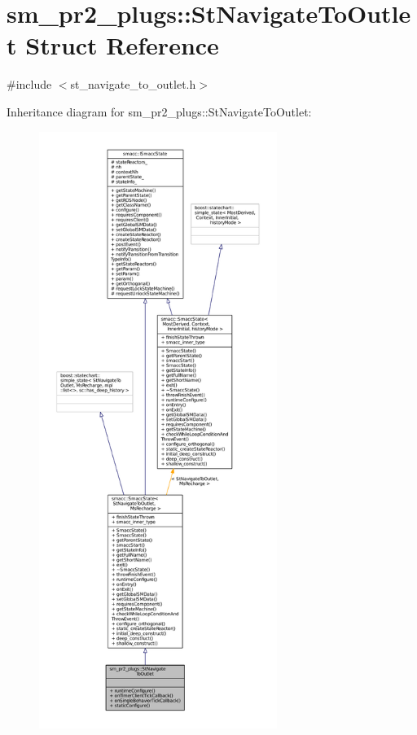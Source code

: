 \hypertarget{structsm__pr2__plugs_1_1StNavigateToOutlet}{}\section{sm\+\_\+pr2\+\_\+plugs\+:\+:St\+Navigate\+To\+Outlet Struct Reference}
\label{structsm__pr2__plugs_1_1StNavigateToOutlet}


{\ttfamily \#include $<$st\+\_\+navigate\+\_\+to\+\_\+outlet.\+h$>$}



Inheritance diagram for sm\+\_\+pr2\+\_\+plugs\+:\+:St\+Navigate\+To\+Outlet\+:
\nopagebreak
\begin{figure}[H]
\begin{center}
\leavevmode
\includegraphics[height=550pt]{structsm__pr2__plugs_1_1StNavigateToOutlet__inherit__graph}
\end{center}
\end{figure}


